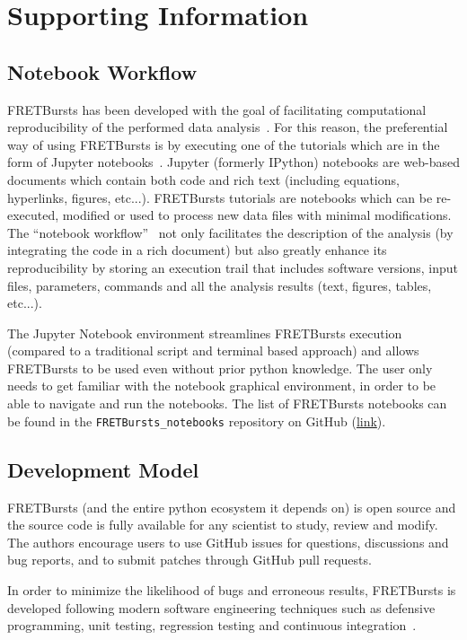 \section{Supporting Information}

\subsection{Notebook Workflow}
FRETBursts has been developed with the goal of facilitating computational reproducibility
of the performed data analysis~\cite{Buckheit_1995}. For this reason,
the preferential way of using FRETBursts is by executing one of the tutorials
which are in the form of Jupyter notebooks~\cite{Shen_2014}.
Jupyter (formerly IPython) notebooks are web-based documents which contain both
code and rich text (including equations, hyperlinks, figures, etc...).
FRETBursts tutorials are notebooks which can be re-executed,
modified or used to process new data files with minimal modifications.
The ``notebook workflow''~\cite{Shen_2014} not only facilitates
the description of the analysis (by integrating the code in a rich document)
but also greatly enhance its reproducibility by storing an execution trail
that includes software versions, input files, parameters, commands and all
the analysis results (text, figures, tables, etc...).

The Jupyter Notebook environment streamlines FRETBursts execution (compared to
a traditional script and terminal based approach) and allows
FRETBursts to be used even without prior python knowledge.
The user only needs to get familiar with the
notebook graphical environment, in order to be able to navigate and run the notebooks.
The list of FRETBursts notebooks can be found in the
\verb|FRETBursts_notebooks| repository on GitHub
(\href{https://github.com/tritemio/FRETBursts_notebooks}{link}).


\subsection{Development Model}

FRETBursts (and the entire python ecosystem it depends on) is open source
and the source code is fully available for any scientist to study,
review and modify.
The authors encourage users to use GitHub issues for questions, discussions
and bug reports, and to submit patches through GitHub pull requests.

In order to minimize the likelihood of bugs and erroneous results, FRETBursts is developed
following modern software engineering techniques such
as defensive programming, unit testing, regression testing and continuous integration~\cite{Wilson_2014}.

